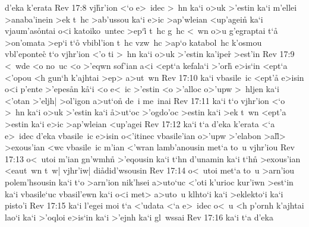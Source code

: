 d'eka
k'erata\bibvsend
\vs Rev 17:8
vj\r{h}r'ion
<`o
e>~idec
>~hn
ka`i
o>uk
>'estin
ka`i
m'ellei
>anaba'inein
>ek
t~hc
>ab'ussou
ka`i
e>ic
>ap'wleian
<up'agei\r{n}
ka`i
vjaum'as\r{o}ntai
o<i
katoiko~untec
>ep`i\r{}
t~hc
g~hc
<~wn
o>u
g'egraptai
t`a\r{}
>on'omata
>ep`i
t`o\r{}
vbibl'ion
t~hc
vzw~hc
>ap`o
katabol~hc
k'osmou
vbl'epontec\r{}
t`o
vjhr'ion
<'o
ti
>~hn
ka`i
o>uk
>'estin
ka'iper\r{}
>est'in\bibvsend
\vs Rev 17:9
<~wde
<o
no~uc
<o
>'eqwn
sof'ian
a<i
<ept`a
kefala`i
>'orh\r{}
e>is`in
<ept`a
<'opou
<h
gun`h
k'ajhtai
>ep>
a>ut~wn\bibvsend
\vs Rev 17:10
ka`i
vbasile~ic
<ept'a\r{}
e>isin
o<i
p'ente
>'epes\r{a}n
k\r{a}`i
<o
e<~ic
>'estin
<o
>'alloc
o>'upw
>~hljen
ka`i
<'otan
>'eljh|
>ol'igon
a>ut`on\r{}
de~i
me~inai\bibvsend
\vs Rev 17:11
ka`i
t`o
vjhr'ion
<`o
>~hn
ka`i
o>uk
>'estin
ka`i
\r{a}>ut`oc
>'ogdo'oc
>estin
ka`i
>ek
t~wn
<ept'a
>estin
ka`i
e>ic
>ap'wleian
<up'agei\bibvsend
\vs Rev 17:12
ka`i
t`a
d'eka
k'erata
<`a
e>~idec
d'eka
vbasile~ic
e>isin
o<'itinec
vbasile'ian
o>'upw
>'elabon
>al\r{l}>
>exous'ian
<wc
vbasile~ic
m'ian
<'wran
lamb'anousin
met`a
to~u
vjhr'iou\bibvsend
\vs Rev 17:13
o<~utoi
m'ian
gn'wmhn\r{}
>'eqousin
ka`i
t`hn
d'unamin
ka`i
t`hn\r{}
>exous'ian
<eaut~wn
t~w|
vjhr'iw|
di\r{a}did'wsousin\bibvsend
{}
\vs Rev 17:14
o<~utoi
met`a
to~u
>arn'iou
polem'hsousin
ka`i
t`o
>arn'ion
nik'hsei
a>uto`uc
<'oti
k'urioc
kur'iwn
>est`in
ka`i
vbasile`uc
vbasil'ewn
ka`i
o<i
met>
a>uto~u
klhto`i
ka`i
>eklekto`i
ka`i
pisto'i\bibvsend
\vs Rev 17:15
ka`i
l'egei
moi
t`a
<'udata
<`a
e>~idec
o<~u
<h
p'ornh
k'ajhtai
lao`i
ka`i
>'oqloi
e>is`in
ka`i
>'ejnh
ka`i
gl~wssai\bibvsend
\vs Rev 17:16
ka`i
t`a
d'eka
